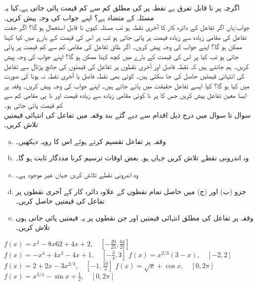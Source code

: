 اگرچہ  پر  نا قابل تفرق ہے نقطہ   پر  کی مطلق کم سے کم قیمت پائی جاتی ہے۔کیا یہ مسئلہ  کے متضاد ہے؟ اپنے جواب کی وجہ پیش کریں۔\\
جواب:\quad ہاں
اگر تفاعل کے دائرہ کار کا آخری نقطہ  ہو تب مسئلہ  کیوں نا قابل استعمال ہو گا؟
اگر جفت تفاعل  کی مقامی زیادہ سے زیادہ قیمت  پر پائی جاتی ہو تب  پر اس کی قیمت کے بارے میں کیا کہنا ممکن ہو گا؟ اپنے جواب کی وجہ پیش کریں۔ 
اگر طاق تفاعل  کی مقامی کم سے کم  قیمت  پر پائی جاتی ہو تب کیا   پر اس کی قیمت کے بارے میں کچھ کہنا ممکن ہو گا؟ اپنے جواب کی وجہ پیش کریں۔ 
ہم جانتے ہیں کہ نقطہ فاصل اور آخری نقطوں پر تفاعل  کی قیمتوں کی جانچ پڑتال سے تفاعل کی انتہائی قیمتیں حاصل کی جا سکتی ہیں۔ کوئی بھی نقطہ فاصل یا آخری نقطہ نہ ہونا کی صورت میں کیا ہو گا؟ کیا ایسے تفاعل حقیقت میں پائے جاتے ہیں۔ اپنے جواب کی وجہ پیش کریں۔
وقفہ  پر ایسا معین تفاعل پیش کریں جس کا  پر نا کوئی مقامی زیادہ سے زیادہ قیمت اور نا ہی مقامی کم سے کم قیمت پائی جاتی ہو۔
\\
سوال  تا سوال  میں درج ذیل اقدام سے دیے گئے بند وقفہ میں تفاعل کی انتہائی قیمتیں تلاش کریں۔
\begin{enumerate}[a.]
\item
وقفہ  پر تفاعل تقسیم کرتے ہوئے اس کا رویہ دیکھیں۔
\item
 وہ اندرونی نقطے تلاش کریں جہاں  ہو۔ بعض اوقات  ترسیم  کرنا مددگار ثابت ہو گا۔
\item
وہ اندرونی نقطے تلاش کریں جہاں  غیر موجود ہے۔
\item
جزو (ب) اور (ج) میں حاصل تمام نقطوں کے علاوہ دائرہ کار کے آخری نقطوں پر تفاعل کی قیمتیں حاصل کریں۔
\item
وقفہ پر تفاعل کی مطلق انتہائی قیمتیں اور جن نقطوں پر یہ قیمتیں پائی جاتی ہوں تلاش کریں۔ 

\end{enumerate}

$f(x)=x^4-8x62+4x+2,\quad [-\tfrac{20}{25},\tfrac{64}{25}]$
$f(x)=-x^4+4x^3-4x+1,\quad [-\tfrac{3}{4},3]$
$f(x)=x^{2/3}(3-x),\quad [-2,2]$
$f(x)=2+2x-3x^{2/3},\quad [-1,\tfrac{10}{3}]$
$f(x)=\sqrt{x}+\cos x,\quad [0,2\pi]$
$f(x)=x^{3/4}-\sin x+\tfrac{1}{2},\quad [0,2\pi]$

